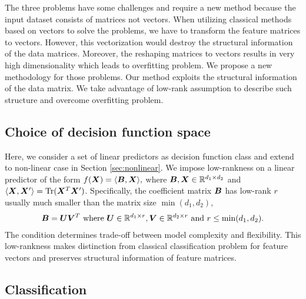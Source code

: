 \documentclass[12pt]{article}
\begin{document}
The three problems have some challenges and require a new method because the input dataset consists of matrices not vectors.
When utilizing classical methods based on vectors to solve the problems, we have to transform the feature matrices to vectors. However, this vectorization would destroy the structural information of the data matrices. Moreover, the reshaping matrices to vectors results in very high dimensionality which leads to overfitting problem.
We propose a new methodology for those problems. Our method exploits the structural information of the data matrix. We take advantage of low-rank assumption to describe such structure and overcome overfitting problem.

\subsection{Choice of decision function space}\label{sec:fcn class}
Here, we consider a set of linear predictors as decision function class and extend to non-linear case in Section \ref{sec:nonlinear}.
 We impose low-rankness on a linear predictor of the form $f(\bm X) = \langle \bm B,\bm X\rangle,$
where $\bm B,\bm X\in\mathbb{R}^{d_1\times d_2}$ and $\langle \bm X,\bm X'\rangle = \text{Tr}(\bm X^T\bm X')$.
Specifically,  the coefficient matrix $\bm B$ has low-rank $r$  usually much smaller than the matrix size  $\min(d_1,d_2)$,
\begin{align}\label{eq:lowrank}
\bm B = \bm{U}\bm{V}^T \text{ where } \bm{U} \in\mathbb{R}^{d_1\times r} ,\bm{V}\in\mathbb{R}^{d_2\times r}\text{ and } r\leq\min(d_1,d_2).
\end{align}
The condition determines trade-off between model complexity and flexibility.  This low-rankness makes distinction from classical classification problem for feature vectors and preserves structural information of feature matrices.
 
\subsection{Classification}
\label{subsec:pb1}
\end{document}
